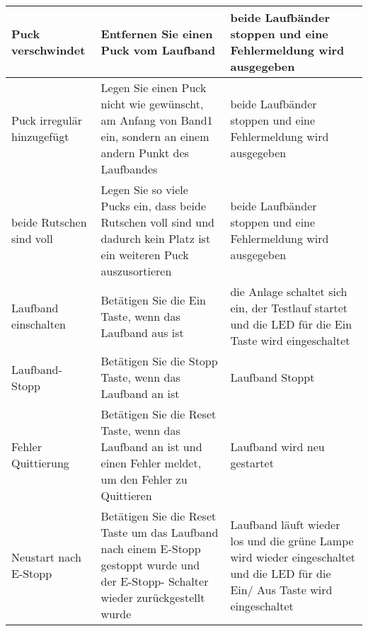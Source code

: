 \documentclass[
   draft=false
  ,paper=a4
  ,twoside=false
  ,fontsize=11pt
  ,headsepline
  ,DIV11
  ,parskip=full+
]{scrartcl} %
\begin{document}
\begin{longtable}{
	|p{0.30\txtw} %
	|p{0.30\txtw} %
	|p{0.30\txtw} %
|}
	Puck verschwindet & Entfernen Sie einen Puck vom Laufband & beide Laufbänder stoppen und eine Fehlermeldung wird ausgegeben  
	\\ \hline 

	Puck irregulär hinzugefügt & Legen Sie einen Puck nicht wie gewünscht, am Anfang von Band1 ein, sondern an einem andern Punkt des Laufbandes & beide Laufbänder stoppen und eine Fehlermeldung wird ausgegeben  
	\\ \hline 
	
	beide Rutschen sind voll & Legen Sie so viele Pucks ein, dass beide Rutschen voll sind und dadurch kein Platz ist ein weiteren Puck auszusortieren & beide Laufbänder stoppen und eine Fehlermeldung wird ausgegeben  
	\\ \hline  
	
	Laufband einschalten & Betätigen Sie die Ein Taste, wenn das Laufband aus ist  & die Anlage schaltet sich ein, der Testlauf startet und die LED für die Ein Taste wird eingeschaltet
	\\ \hline 
	
	Laufband- Stopp & Betätigen Sie die Stopp Taste, wenn das Laufband an ist  & Laufband Stoppt
	\\ \hline 
	
	Fehler Quittierung &  Betätigen Sie die Reset Taste, wenn das Laufband an ist und einen Fehler meldet, um den Fehler zu Quittieren & Laufband wird neu gestartet
	\\ \hline 

   Neustart nach E-Stopp & Betätigen Sie die Reset Taste um das Laufband nach einem E-Stopp gestoppt wurde und der E-Stopp-  Schalter wieder zurückgestellt wurde & Laufband läuft wieder los und die grüne Lampe wird wieder eingeschaltet und die LED für die Ein/ Aus Taste wird eingeschaltet
	
\end{longtable}

\vspace{-2.5em}
\footnotesize

\normalsize

\flushleft
\end{document}
